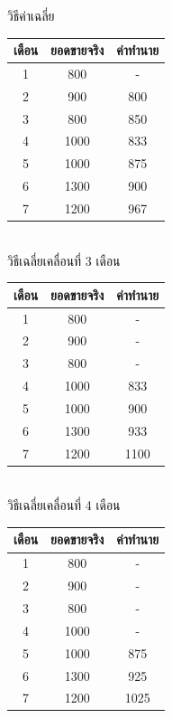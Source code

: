 วิธีค่าเฉลี่ย\\
\begin{tabular}{|c|c|c|}
	\hline
	เดือน & ยอดขายจริง & ค่าทำนาย \\ \hline
	1     & 800        & -              \\ \hline
	2     & 900        & 800           \\ \hline
	3     & 800        & 850           \\ \hline
	4     & 1000       & 833           \\ \hline
	5     & 1000       & 875           \\ \hline
	6     & 1300       & 900           \\ \hline
	7     & 1200       & 967           \\ \hline
\end{tabular}
\vspace{1cm}\\
วิธีเฉลี่ยเคลื่อนที่ 3 เดือน\\
\begin{tabular}{|c|c|c|}
	\hline
	เดือน & ยอดขายจริง & ค่าทำนาย \\ \hline
	1     & 800        &   -            \\ \hline
	2     & 900        &  -          \\ \hline
	3     & 800        &   -         \\ \hline
	4     & 1000       & 833           \\ \hline
	5     & 1000       & 900           \\ \hline
	6     & 1300       & 933           \\ \hline
	7     & 1200       & 1100           \\ \hline
\end{tabular}
\vspace{1cm}\\
วิธีเฉลี่ยเคลื่อนที่ 4 เดือน\\
\begin{tabular}{|c|c|c|}
	\hline
	เดือน & ยอดขายจริง & ค่าทำนาย \\ \hline
	1     & 800        &  -             \\ \hline
	2     & 900        &  -          \\ \hline
	3     & 800        &   -         \\ \hline
	4     & 1000       &  -          \\ \hline
	5     & 1000       & 875           \\ \hline
	6     & 1300       & 925           \\ \hline
	7     & 1200       & 1025           \\ \hline
\end{tabular}
